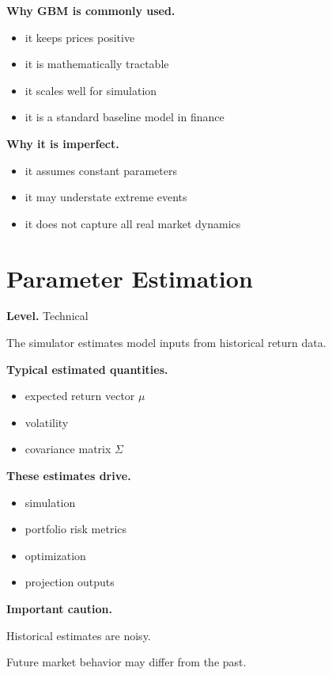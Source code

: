 \documentclass[11pt]{report}
\begin{document}
\textbf{Why GBM is commonly used.}

\begin{itemize}
\item it keeps prices positive
\item it is mathematically tractable
\item it scales well for simulation
\item it is a standard baseline model in finance
\end{itemize}

\textbf{Why it is imperfect.}

\begin{itemize}
\item it assumes constant parameters
\item it may understate extreme events
\item it does not capture all real market dynamics
\end{itemize}

\section{Parameter Estimation}
\begin{callout}
\textbf{Level.} Technical
\end{callout}

The simulator estimates model inputs from historical return data.

\textbf{Typical estimated quantities.}

\begin{itemize}
\item expected return vector $\mu$
\item volatility
\item covariance matrix $\Sigma$
\end{itemize}

\textbf{These estimates drive.}

\begin{itemize}
\item simulation
\item portfolio risk metrics
\item optimization
\item projection outputs
\end{itemize}

\textbf{Important caution.}

Historical estimates are noisy.

Future market behavior may differ from the past.
\end{document}
